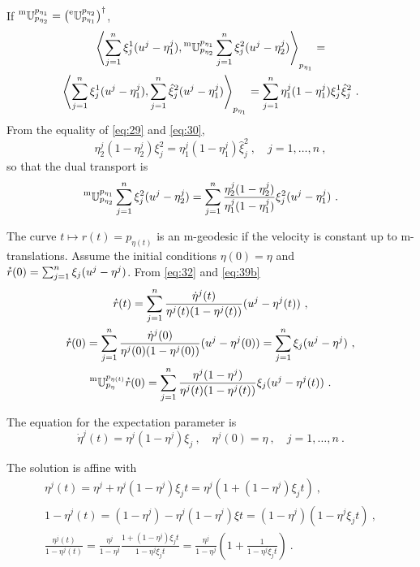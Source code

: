 \documentclass[12pt,a4paper]{amsart}
\newcommand{\transposed}{\dagger}
\theoremstyle{remark}
\begin{document}
If $\mtransport {p_{\eta_2}} {p_{\eta_1}} = \left(\etransport {p_{\eta_1}} {p_{\eta_2}}\right)^\transposed$,
\begin{multline}
  \label{eq:39a}
  \scalarat {p_{\eta_1}} {\sum_{j=1}^n \xi_j^1(u^j - \eta^j_1)} {\mtransport {p_{\eta_2}} {p_{\eta_1}}\sum_{j=1}^n \xi_j^2(u^j - \eta^j_2)} = \\
   \scalarat {p_{\eta_1}} {\sum_{j=1}^n \xi_j^1(u^j - \eta^j_1)} {\sum_{j=1}^n \hat \xi_j^2(u^j - \eta^j_1)} = 
   \sum_{j=1}^n \eta^j_1(1-\eta^j_1) \xi_j^1 \hat \xi_j^2 \ . 
\end{multline}
From the equality of \cref{eq:29} and \cref{eq:30},
\begin{equation}
\eta^j_2(1-\eta^j_2) \xi_j^2 = \eta^j_1(1-\eta^j_1) \hat \xi_j^2 \ , \quad j=1,\dots,n \ ,
\end{equation}
so that the dual transport is
\begin{equation}
  \label{eq:39b}
\mtransport {p_{\eta_2}} {p_{\eta_1}} \sum_{j=1}^n \xi_j^2(u^j - \eta^j_2) = 
\sum_{j=1}^n \frac{\eta^j_2(1-\eta^j_2)} {\eta^j_1(1-\eta^j_1)} \xi_j^2 (u^j - \eta^j_1) \ .
\end{equation}

The curve $t \mapsto r(t) = p_{\eta(t)}$ is an m-geodesic if the velocity is constant up to m-translations. Assume the initial conditions $\eta(0) = \eta$ and $\accentset{\star}{r}(0) = \sum_{j=1}^n \xi_j(u^j - \eta^j)$. From \cref{eq:32} and \cref{eq:39b}
\begin{gather}
  \label{eq:40}
  \velocity r(t) =  \sum_{j=1}^n \frac{\dot \eta^j(t)}{\eta^j(t)(1 - \eta^j(t))} (u^j - \eta^j(t)) \ , \\
  \velocity r(0) =  \sum_{j=1}^n \frac{\dot \eta^j(0)}{\eta^j(0)(1 - \eta^j(0))} (u^j - \eta^j(0)) = \sum_{j=1}^n \xi_j(u^j - \eta^j) \ , \\
\mtransport {p_{\eta}} {p_{\eta(t)}} \velocity r(0) =  \sum_{j=1}^n \frac{\eta^j(1-\eta^j)} {\eta^j(t)(1-\eta^j(t))} \xi_j (u^j - \eta^j(t)) \ .
\end{gather}

The equation for the expectation parameter is
\begin{equation}
  \label{eq:41}
  \dot \eta^j(t) = \eta^j(1-\eta^j) \xi_j \ , \quad \eta^j(0) = \eta \ , \quad j = 1,\dots,n \ .
\end{equation}

The solution is affine with
\begin{gather}
  \label{eq:44}
  \eta^j(t) = \eta^j + \eta^j(1-\eta^j) \xi_j t = \eta^j\left (1 + (1-\eta^j) \xi_j t\right) \ ,\\
  1 - \eta^j(t) = (1 - \eta^j) - \eta^j(1-\eta^j) \xi t = (1 - \eta^j)(1 -\eta^j\xi_j t) \ , \\
  \frac{\eta^j(t)}{1-\eta^j(t)} = \frac{\eta^j}{1-\eta^j} \frac{1 + (1-\eta^j) \xi_j t}{1 -\eta^j\xi_j t} = \frac{\eta^j}{1-\eta^j} \left(1 + \frac{1}{1 -\eta^j\xi_j t}\right) \ .
\end{gather}
\end{document}
